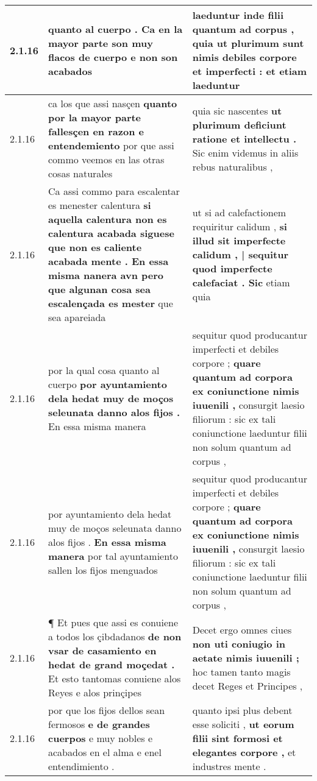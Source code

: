 \begin{tabular}{|p{1cm}|p{6.5cm}|p{6.5cm}|}
2.1.16 & quanto al cuerpo . \textbf{ Ca en la mayor parte son muy flacos de cuerpo } e non son acabados & laeduntur inde filii quantum ad corpus , \textbf{ quia ut plurimum sunt nimis debiles corpore et imperfecti : } et etiam laeduntur \\\hline
2.1.16 & ca los que assi nasçen \textbf{ quanto por la mayor parte fallesçen en razon e entendemiento } por que assi commo veemos en las otras cosas naturales & quia sic nascentes \textbf{ ut plurimum deficiunt ratione et intellectu . } Sic enim videmus in aliis rebus naturalibus , \\\hline
2.1.16 & Ca assi commo para escalentar es menester calentura \textbf{ si aquella calentura non es calentura acabada siguese que non es caliente acabada mente . En essa misma nanera avn pero que algunan cosa sea escalençada es mester } que sea apareiada & ut si ad calefactionem requiritur calidum , \textbf{ si illud sit imperfecte calidum , | sequitur quod imperfecte calefaciat . Sic } etiam quia \\\hline
2.1.16 & por la qual cosa quanto al cuerpo \textbf{ por ayuntamiento dela hedat muy de moços seleunata danno alos fijos . } En essa misma manera & sequitur quod producantur imperfecti et debiles corpore ; \textbf{ quare quantum ad corpora ex coniunctione nimis iuuenili , } consurgit laesio filiorum : sic ex tali coniunctione laeduntur filii non solum quantum ad corpus , \\\hline
2.1.16 & por ayuntamiento dela hedat muy de moços seleunata danno alos fijos . \textbf{ En essa misma manera } por tal ayuntamiento sallen los fijos menguados & sequitur quod producantur imperfecti et debiles corpore ; \textbf{ quare quantum ad corpora ex coniunctione nimis iuuenili , } consurgit laesio filiorum : sic ex tali coniunctione laeduntur filii non solum quantum ad corpus , \\\hline
2.1.16 & ¶ Et pues que assi es conuiene a todos los çibdadanos \textbf{ de non vsar de casamiento en hedat de grand moçedat . } Et esto tantomas conuiene alos Reyes e alos prinçipes & Decet ergo omnes ciues \textbf{ non uti coniugio in aetate nimis iuuenili ; } hoc tamen tanto magis decet Reges et Principes , \\\hline
2.1.16 & por que los fijos dellos sean fermosos \textbf{ e de grandes cuerpos } e muy nobles e acabados en el alma e enel entendimiento . & quanto ipsi plus debent esse soliciti , \textbf{ ut eorum filii sint formosi et elegantes corpore , } et industres mente . \\\hline

\end{tabular}
